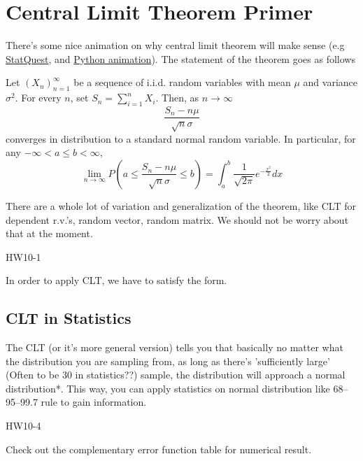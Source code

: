 \section{Central Limit Theorem Primer}
There's some nice animation on why central limit theorem will make sense (e.g \href{https://youtu.be/YAlJCEDH2uY}{StatQuest}, and \href{https://www.kaggle.com/code/carlmcbrideellis/animated-histogram-of-the-central-limit-theorem/notebook}{Python animation}). The statement of the theorem goes as follows 
\begin{theorem}[CLT]
    Let \((X_n)_{n=1}^{\infty} \) be a sequence of i.i.d. random variables with mean \(\mu \) and variance \(\sigma^2 \). 
    For every \(n\), set \(S_n = \sum_{i=1}^{n} X_i\). Then, as \(n \to \infty\)
    \[
        \frac{S_n - n \mu }{\sqrt{n} \sigma }
    \] 
    converges in distribution to a standard normal random variable. In particular, for any \(-\infty <a \leq b < \infty \), 
    \[
        \lim\limits_{n \to \infty} P(a \leq \frac{S_n -n \mu }{\sqrt{n}\sigma  } \leq  b) = \int_a^b \frac{1}{\sqrt{2\pi } } e^{-\frac{x^2}{2}}dx
    \]
\end{theorem}
There are a whole lot of variation and generalization of the theorem, like CLT for dependent r.v.'s, random vector, random matrix. We should not be worry about that at the moment. 

\begin{eg}
    HW10-1 
\end{eg}
In order to apply CLT, we have to satisfy the form. 

\subsection*{CLT in Statistics}
The CLT (or it's more general version) tells you that basically no matter what the distribution you are sampling from, as long as there's 'sufficiently large' (Often to be 30 in statistics??) sample, the distribution will approach a normal distribution*. This way, you can apply statistics on normal distribution like 68–95–99.7 rule to gain information. 

\begin{eg}
HW10-4     
\end{eg}
Check out the complementary error function table for numerical result. 
